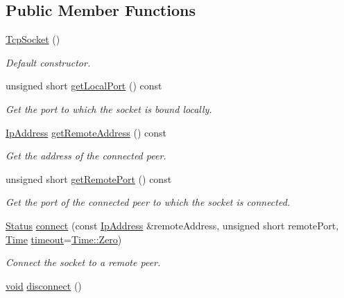 \subsection*{Public Member Functions}
\begin{DoxyCompactItemize}
\item 
\hyperlink{classsf_1_1_tcp_socket_a62a9bf81fd7f15fedb29fd1348483236}{Tcp\-Socket} ()
\begin{DoxyCompactList}\small\item\em Default constructor. \end{DoxyCompactList}\item 
unsigned short \hyperlink{classsf_1_1_tcp_socket_ab47eeb1cb71f2f251a83bc823773f1b3}{get\-Local\-Port} () const 
\begin{DoxyCompactList}\small\item\em Get the port to which the socket is bound locally. \end{DoxyCompactList}\item 
\hyperlink{classsf_1_1_ip_address}{Ip\-Address} \hyperlink{classsf_1_1_tcp_socket_a7904ca6ab9e018021e305a3aeb7a1b9a}{get\-Remote\-Address} () const 
\begin{DoxyCompactList}\small\item\em Get the address of the connected peer. \end{DoxyCompactList}\item 
unsigned short \hyperlink{classsf_1_1_tcp_socket_abc05220e06f1522144cecab822e79296}{get\-Remote\-Port} () const 
\begin{DoxyCompactList}\small\item\em Get the port of the connected peer to which the socket is connected. \end{DoxyCompactList}\item 
\hyperlink{classsf_1_1_socket_a51bf0fd51057b98a10fbb866246176dc}{Status} \hyperlink{classsf_1_1_tcp_socket_a68cd42d5ab70ab54b16787f555951c40}{connect} (const \hyperlink{classsf_1_1_ip_address}{Ip\-Address} \&remote\-Address, unsigned short remote\-Port, \hyperlink{classsf_1_1_time}{Time} \hyperlink{gl3_8h_ad29bb0d8468b264a4e3d9204366cfaab}{timeout}=\hyperlink{classsf_1_1_time_a8db127b632fa8da21550e7282af11fa0}{Time\-::\-Zero})
\begin{DoxyCompactList}\small\item\em Connect the socket to a remote peer. \end{DoxyCompactList}\item 
\hyperlink{glutf90_8h_ac778d6f63f1aaf8ebda0ce6ac821b56e}{void} \hyperlink{classsf_1_1_tcp_socket_ac18f518a9be3d6be5e74b9404c253c1e}{disconnect} ()

\end{DoxyCompactItemize}
